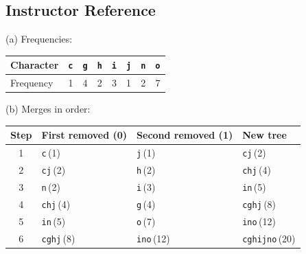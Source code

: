 \documentclass[11pt]{article}
\begin{document}
\subsection*{Instructor Reference}
(a) Frequencies:
\begin{center}
\begin{tabular}{|l|c|c|c|c|c|c|c|}
\hline
 Character & \texttt{c} & \texttt{g} & \texttt{h} & \texttt{i} & \texttt{j} & \texttt{n} & \texttt{o} \\
\hline
 Frequency & 1 & 4 & 2 & 3 & 1 & 2 & 7 \\
\hline
\end{tabular}
\end{center}
(b) Merges in order:
\begin{center}
\begin{tabular}{|c|l|l|l|}
\hline
 Step & First removed (0) & Second removed (1) & New tree \\
\hline
 1 & \texttt{c}\,(1) & \texttt{j}\,(1) & \texttt{cj}\,(2) \\
\hline
 2 & \texttt{cj}\,(2) & \texttt{h}\,(2) & \texttt{chj}\,(4) \\
\hline
 3 & \texttt{n}\,(2) & \texttt{i}\,(3) & \texttt{in}\,(5) \\
\hline
 4 & \texttt{chj}\,(4) & \texttt{g}\,(4) & \texttt{cghj}\,(8) \\
\hline
 5 & \texttt{in}\,(5) & \texttt{o}\,(7) & \texttt{ino}\,(12) \\
\hline
 6 & \texttt{cghj}\,(8) & \texttt{ino}\,(12) & \texttt{cghijno}\,(20) \\
\hline
\end{tabular}
\end{center}
\end{document}
